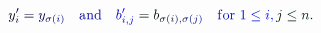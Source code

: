 \documentclass[12pt]{article}
\begin{document}
\makeatletter
\renewcommand*{\@textcolor}[3]{%
  \protect\leavevmode
  \begingroup
    \color#1{#2}#3%
  \endgroup
}
\makeatother
\begin{displaymath}
\mathcolor[RGB]{0,0,15}{y} _ { \mathcolor[RGB]{0,0,30}{i} } ^ { \mathcolor[RGB]{0,0,45}{\prime} } \mathcolor[RGB]{0,0,60}{=} \mathcolor[RGB]{0,0,75}{y} _ { \mathcolor[RGB]{0,0,90}{\sigma} \mathcolor[RGB]{0,0,105}{(} \mathcolor[RGB]{0,0,120}{i} \mathcolor[RGB]{0,0,135}{)} } \quad \mathrm { \mathcolor[RGB]{0,0,150}{a} \mathcolor[RGB]{0,0,165}{n} \mathcolor[RGB]{0,0,180}{d} } \mathcolor[RGB]{0,0,195}{\quad
b} _ { \mathcolor[RGB]{0,0,210}{i} \mathcolor[RGB]{0,0,225}{,} \mathcolor[RGB]{0,0,240}{j} } ^ { \mathcolor[RGB]{0,0,255}{\prime} } \mathcolor[RGB]{0,15,0}{=} \mathcolor[RGB]{0,15,15}{b} _ { \mathcolor[RGB]{0,15,30}{\sigma} \mathcolor[RGB]{0,15,45}{(} \mathcolor[RGB]{0,15,60}{i} \mathcolor[RGB]{0,15,75}{)} \mathcolor[RGB]{0,15,90}{,} \mathcolor[RGB]{0,15,105}{\sigma} \mathcolor[RGB]{0,15,120}{(} \mathcolor[RGB]{0,15,135}{j} \mathcolor[RGB]{0,15,150}{)} } \quad \mathrm { \mathcolor[RGB]{0,15,165}{f} \mathcolor[RGB]{0,15,180}{o} \mathcolor[RGB]{0,15,195}{r} ~ } \mathcolor[RGB]{0,15,210}{1} \mathcolor[RGB]{0,15,225}{\le} \mathcolor[RGB]{0,15,240}{i} \mathcolor[RGB]{0,15,255}{,} \mathcolor[RGB]{0,30,0}{j} \mathcolor[RGB]{0,30,15}{\le} \mathcolor[RGB]{0,30,30}{n} \mathcolor[RGB]{0,30,45}{.}
\end{displaymath}
\end{document}
